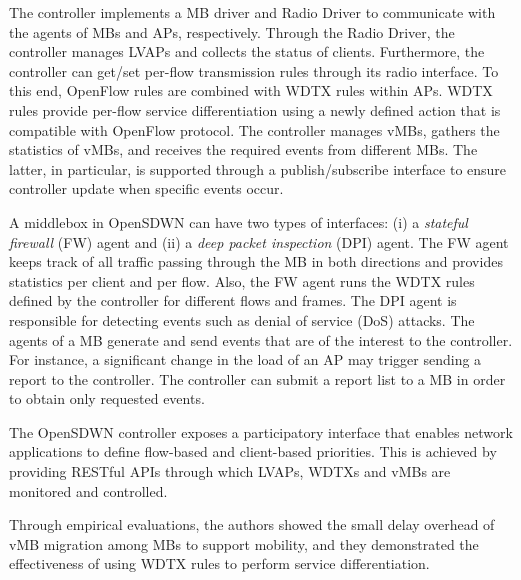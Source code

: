 The controller implements a MB driver and Radio Driver to communicate with the agents of MBs and APs, respectively. 
Through the Radio Driver, the controller manages LVAPs and collects the status of clients. 
Furthermore, the controller can get/set per-flow transmission rules through its radio interface. 
To this end, OpenFlow rules are combined with WDTX rules within APs.
WDTX rules provide per-flow service differentiation using a newly defined action that is compatible with OpenFlow protocol. 
The controller manages vMBs, gathers the statistics of vMBs, and receives the required events from different MBs. 
The latter, in particular, is supported through a publish/subscribe interface to ensure controller update when specific events occur.

A middlebox in OpenSDWN can have two types of interfaces: (i) a \textit{stateful firewall} (FW) agent and (ii) a \textit{deep packet inspection} (DPI) agent. 
The FW agent keeps track of all traffic passing through the MB in both directions and provides statistics per client and per flow. 
Also, the FW agent runs the WDTX rules defined by the controller for different flows and frames. 
The DPI agent is responsible for detecting events such as denial of service (DoS) attacks. 
The agents of a MB generate and send events that are of the interest to the controller. 
For instance, a significant change in the load of an AP may trigger sending a report to the controller. 
The controller can submit a report list to a MB in order to obtain only requested events. 

The OpenSDWN controller exposes a participatory interface that enables network applications to define flow-based and client-based priorities.
This is achieved by providing RESTful APIs through which LVAPs, WDTXs and vMBs are monitored and controlled.  

Through empirical evaluations, the authors showed the small delay overhead of vMB migration among MBs to support mobility, and they demonstrated the effectiveness of using WDTX rules to perform service differentiation. 



